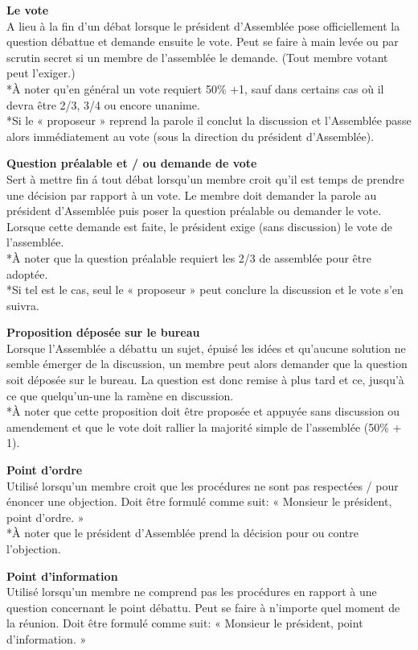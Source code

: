 \begin{multicols}{2}
\noindent
\textbf{Le vote}\\
A lieu à la fin d'un débat lorsque le président d'Assemblée pose officiellement la question débattue et demande ensuite le vote. Peut se faire à main levée ou par scrutin secret si un 
membre de l’assemblée le demande. (Tout membre votant peut l'exiger.)\\
*À noter qu'en général un vote requiert 50\% +1, sauf dans certains cas où il devra être 2/3, 3/4 ou encore unanime.\\ 
*Si le « proposeur » reprend la parole il conclut la discussion et l'Assemblée passe alors 
immédiatement au vote (sous la direction du président d'Assemblée).

\bigskip
\noindent
\textbf{Question préalable et / ou demande de vote}\\
Sert à mettre fin á tout débat lorsqu'un membre croit qu'il est temps de prendre une décision par rapport à un vote. Le membre doit demander la parole au président d'Assemblée puis poser la question préalable ou demander le vote. Lorsque cette demande est faite, le président exige (sans discussion) le vote de l'assemblée.\\
*À noter que la question préalable requiert les 2/3 de assemblée pour être adoptée.\\
*Si tel est le cas, seul le « proposeur » peut conclure la discussion et le vote s'en suivra. 

\bigskip
\noindent
\textbf{Proposition déposée sur le bureau}\\
Lorsque l'Assemblée a débattu un sujet, épuisé les idées et qu'aucune solution ne semble émerger de la discussion, un membre peut alors demander que la question soit déposée sur le bureau. La question est donc remise à plus tard et ce, jusqu'à ce que quelqu'un-une la ramène en discussion.\\
*À noter que cette proposition doit être proposée et appuyée sans discussion ou amendement et que le vote doit rallier la majorité simple de l'assemblée (50\% + 1).

\bigskip
\noindent
\textbf{Point d'ordre}\\
Utilisé lorsqu'un membre croit que les procédures ne sont pas respectées / pour énoncer une 
objection. Doit être formulé comme suit: « Monsieur le président, point d'ordre. »\\
*À noter que le président d'Assemblée prend la décision pour ou contre l'objection.

\bigskip
\noindent
\textbf{Point d'information}\\
Utilisé lorsqu'un membre ne comprend pas les procédures en rapport à une question concernant le point débattu. Peut se faire à n'importe quel moment de la réunion. Doit être formulé comme 
suit: « Monsieur le président, point d'information. »


\end{multicols}

